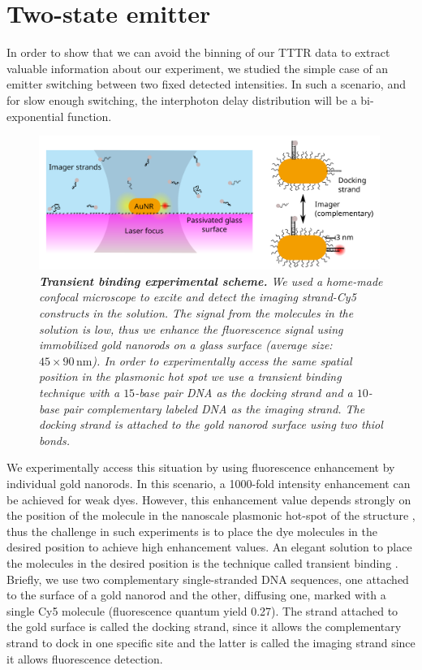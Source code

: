 \section{Two-state emitter \label{sec:TB}}
%
In order to show that we can avoid the binning of our TTTR data to 
extract valuable information about our experiment, we studied the 
simple case of an emitter switching between two fixed detected intensities. 
In such a scenario, and for slow enough switching,
the interphoton delay distribution will be a bi-exponential function.

\begin{figure}
\includegraphics[width=0.99\textwidth]{01_Figure_1_Transient_scheme}%
\caption{\textit{\textbf{Transient binding experimental scheme.} We used a 
home-made confocal microscope to excite and detect the imaging 
strand-Cy5 constructs in the solution. The signal from the molecules 
in the solution is low, thus we enhance the fluorescence signal using 
immobilized gold nanorods on a glass surface (average size: $45\times90 \,\mbox{nm}$). 
In order to experimentally access the same spatial position in the plasmonic 
hot spot we use a transient binding technique with a $15$-base pair 
DNA as the docking strand and a $10$-base pair complementary labeled DNA as the imaging strand. 
The docking strand is attached to the gold nanorod surface using 
two thiol bonds. } 
\label{fg:TB} }
\end{figure}

%
We experimentally access this situation by using fluorescence enhancement
by individual gold nanorods. In this scenario, 
a 1000-fold intensity enhancement can be achieved for weak 
dyes\cite{yuan2013thousandfold,khatua2014resonant}. However, this enhancement value
depends strongly on the position of the molecule in the nanoscale plasmonic 
hot-spot of the structure \cite{khatua2014resonant}, thus the challenge in 
such experiments is to place the dye molecules in the desired position to 
achieve high enhancement values. An elegant solution to place the molecules 
in the desired position is the technique called transient binding \cite{acuna2012fluorescence}.
Briefly, we use two complementary single-stranded DNA sequences, one attached
to the surface of a gold nanorod and the other, diffusing one, marked with a single Cy5
molecule (fluorescence quantum yield 0.27). The strand attached to the gold 
surface is called the docking strand, since it allows the complementary strand 
to dock in one specific site and the latter is called the imaging strand since 
it allows fluorescence detection. 

